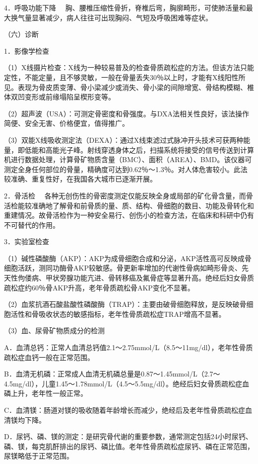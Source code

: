 {4．呼吸功能下降}
　胸、腰椎压缩性骨折，脊椎后弯，胸廓畸形，可使肺活量和最大换气量显著减少，病人往往可出现胸闷、气短及呼吸困难等症状。

（六）诊断

{1．影像学检查}

（1）X线摄片检查：X线为一种较易普及的检查骨质疏松症的方法。但该方法只能定性，不能定量，且不够灵敏，一般在骨量丢失30％以上时，才能有X线阳性所见。表现为骨皮质变薄、骨小梁减少或消失、骨小梁的间隙增宽、骨结构模糊、椎体双凹变形或前缘塌陷呈楔形变等。

（2）超声波（USA）：可测定骨密度和骨强度。与DXA法相关性良好，该法操作简便、安全无害、价格便宜，值得推广。

（3）双能X线吸收测定法（DEXA）：通过X线束滤过式脉冲开头技术可获两种能量，即低能和高能光子峰。射线穿透身体之后，扫描系统将接受的信号传送到计算机进行数据处理，计算骨矿物质含量（BMC）、面积（AREA）、BMD。该仪器可测定全身任何部位的骨量，精确度可达到0.62％～1.3％。对人体危害较小。此法较准确、重复性好，在我国各大城市已逐渐开展。

{2．骨活检}
　各种无创伤性的骨密度测定仅能反映全身或局部的矿化骨含量，而骨活检能较准确地了解骨和前骨质的量、质、结构、骨细胞的数目、功能及骨转化和重建情况。故骨活检作为一种安全易行、创伤小的检查方法，在临床和科研中仍有不可替代的作用。

{3．实验室检查}

（1）碱性磷酸酶（AKP）：AKP为成骨细胞合成和分泌，AKP活性高可反映成骨细胞活跃，测同功酶骨AKP较敏感。骨更新率增加的代谢性骨病如畸形骨炎、先天性佝偻病、甲状旁腺功能亢进、骨转移癌及氟骨症等显著升高。绝经后妇女骨质疏松症约60％骨AKP升高，老年骨质疏松骨AKP变化不显著。

（2）血浆抗酒石酸盐酸性磷酸酶（TRAP）：主要由破骨细胞释放，是反映破骨细胞活性和骨吸收状态的敏感指标，老年性骨质疏松症TRAP增高不显著。

（3）血、尿骨矿物质成分的检测

A．血清总钙：正常人血清总钙值2.1～2.75mmol/L（8.5～11mg/dl），老年性骨质疏松症血钙一般在正常范围。

B．血清无机磷：正常成人血清无机磷总量是0.87～1.45mmol/L（2.7～4.5mg/dl），儿童1.45～1.78mmol/L（4.5～5.5mg/dl）。绝经后妇女骨质疏松症血磷上升，老年性一般正常。

C．血清镁：肠道对镁的吸收随着年龄增长而减少，绝经后及老年性骨质疏松症血清镁均下降。

D．尿钙、磷、镁的测定：是研究骨代谢的重要参数，通常测定包括24小时尿钙、磷、镁，每克肌酐排出的尿钙、磷比值。老年性骨质疏松症尿钙、磷在正常范围，尿镁略低于正常范围。

